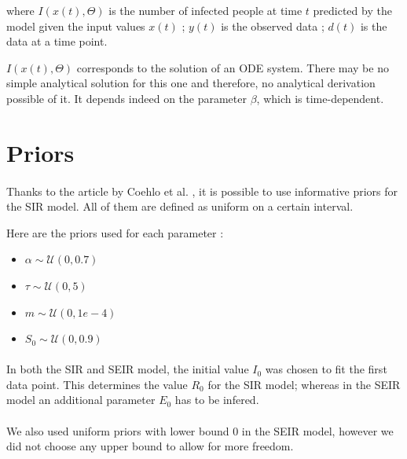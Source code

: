 \documentclass[11pt, a4paper]{article}
\begin{document}
where $I(x(t), \Theta)$ is the number of infected people at time $t$ predicted by the model given the input values $x(t)$ ; $y(t)$ is the observed data ; $d(t)$ is the data at a time point.

$I(x(t), \Theta)$ corresponds to the solution of an ODE system. There may be no simple analytical solution for this one and therefore, no analytical derivation possible of it. It depends indeed on the parameter $\beta$, which is time-dependent.

\section{Priors}
\paragraph{}
Thanks to the article by Coehlo et al. \cite{coelho2011bayesian}, it is possible to use informative priors for the SIR model. All of them are defined as uniform on a certain interval.

Here are the priors used for each parameter : 
\begin{itemize}
\item $\alpha \sim \mathcal{U}(0, 0.7)$
\item $\tau \sim \mathcal{U}(0, 5)$
\item $m \sim  \mathcal{U}(0, 1e-4)$
\item $S_0 \sim \mathcal{U}(0, 0.9)$
\end{itemize}

\paragraph{}
In both the SIR and SEIR model, the initial value $I_0$ was chosen to fit the first data point. This determines the value $R_0$ for the SIR model; whereas in the SEIR model an additional parameter $E_0$ has to be infered.

\paragraph{}
We also used uniform priors with lower bound 0 in the SEIR model, however we did not choose any upper bound to allow for more freedom.

\end{document}
